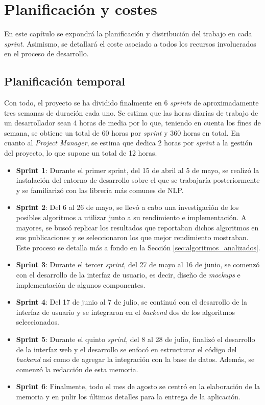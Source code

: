 \chapter{Planificación y costes}
\label{chap:planificacion}

En este capítulo se expondrá la planificación y distribución del trabajo en cada \textit{sprint}. Asimismo,
se detallará el coste asociado a todos los recursos involucrados en el proceso de desarrollo.

\section{Planificación temporal}
\label{sec:planificacion_temporal}

Con todo, el proyecto se ha dividido finalmente en 6 \textit{sprints} de aproximadamente tres semanas de duración cada uno.
Se estima que las horas diarias de trabajo de un desarrollador sean 4 horas de media por lo que, teniendo en cuenta los fines de semana, se obtiene
un total de 60 horas por \textit{sprint} y 360 horas en total. En cuanto al \textit{Project Manager}, se estima que dedica 2 horas por \textit{sprint}
a la gestión del proyecto, lo que supone un total de 12 horas.

\begin{itemize}
	\item \textbf{Sprint 1}: Durante el primer sprint, del 15 de abril al 5 de mayo, se realizó la instalación del entorno
	de desarrollo sobre el que se trabajaría posteriormente y se familiarizó con las librería más comunes de NLP.
	\item \textbf{Sprint 2}: Del 6 al 26 de mayo, se llevó a cabo una investigación de los posibles algoritmos a utilizar
	junto a su rendimiento e implementación. A mayores, se buscó replicar los resultados que reportaban dichos algoritmos
	en sus publicaciones y se seleccionaron los que mejor rendimiento mostraban. Este proceso se detalla más a fondo en la Sección \ref{sec:algoritmos_analizados}.
	\item \textbf{Sprint 3}: Durante el tercer \textit{sprint}, del 27 de mayo al 16 de junio, se comenzó con el desarrollo
	de la interfaz de usuario, es decir, diseño de \textit{mockups} e implementación de algunos componentes.
	\item \textbf{Sprint 4}: Del 17 de junio al 7 de julio, se continuó con el desarrollo de la interfaz de usuario y se integraron
	en el \textit{backend} dos de los algoritmos seleccionados.
	\item \textbf{Sprint 5}: Durante el quinto \textit{sprint}, del 8 al 28 de julio, finalizó el desarrollo de la interfaz web
	y el desarrollo se enfocó en estructurar el código del \textit{backend} así como de agregar la integración con la base de datos. 
	Además, se comenzó la redacción de esta memoria.
	\item \textbf{Sprint 6}: Finalmente, todo el mes de agosto se centró en la elaboración de la memoria y en pulir los últimos detalles
	para la entrega de la aplicación.
\end{itemize}

